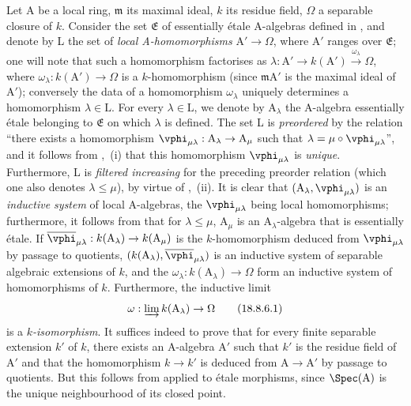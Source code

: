 \begin{env}[18.8.6]
\label{IV.18.8.6}
Let A be a local ring, $\mathfrak{m}$ its maximal ideal, $k$ its residue field, $\Omega$ a separable closure of $k$.
Consider the set $\mathfrak{E}$ of essentially \'{e}tale A-algebras defined in , and denote by L the set of \emph{local A-homomorphisms} $\mathrm{A}'\to\Omega$, where $\mathrm{A}'$ ranges over $\mathfrak{E}$;
one will note that such a homomorphism factorises as $\lambda:\mathrm{A}'\to k(\mathrm{A}')\xrightarrow{\omega_\lambda}\Omega$, where $\omega_\lambda:k(\mathrm{A}')\to\Omega$ is a $k$-homomorphism (since $\mathfrak{m}\mathrm{A}'$ is the maximal ideal of $\mathrm{A}'$);
conversely the data of a homomorphism $\omega_\lambda$ uniquely determines a homomorphism $\lambda\in\mathrm{L}$.
For every $\lambda\in\mathrm{L}$, we denote by $\mathrm{A}_\lambda$ the A-algebra essentially \'{e}tale belonging to $\mathfrak{E}$ on which $\lambda$ is defined.
The set L is \emph{preordered} by the relation ``there exists a homomorphism $\vphi_{\mu\lambda}:\mathrm{A}_\lambda\to\mathrm{A}_\mu$ such that $\lambda=\mu\circ\vphi_{\mu\lambda}$'', and it follows from ,~(i) that this homomorphism $\vphi_{\mu\lambda}$ is \emph{unique}.
Furthermore, L is \emph{filtered increasing} for the preceding preorder relation (which one also denotes $\lambda\leq\mu$), by virtue
of ,~(ii).
It is clear that $(\mathrm{A}_\lambda,\vphi_{\mu\lambda})$ is an \emph{inductive system} of local A-algebras, the $\vphi_{\mu\lambda}$ being local homomorphisms;
furthermore, it follows from  that for $\lambda\leq\mu$, $\mathrm{A}_\mu$ is an $\mathrm{A}_\lambda$-algebra that is essentially \'{e}tale.
If $\overline{\vphi}_{\mu\lambda}:k(\mathrm{A}_\lambda)\to k(\mathrm{A}_\mu)$ is the $k$-homomorphism deduced from $\vphi_{\mu\lambda}$ by passage to quotients, $(k(\mathrm{A}_\lambda),\overline{\vphi}_{\mu\lambda})$ is an inductive system of separable algebraic extensions of $k$, and the $\omega_\lambda:k(\mathrm{A}_\lambda)\to\Omega$ form an inductive system of homomorphisms of $k$.
Furthermore, the inductive limit
\begin{equation}
  \omega:\varinjlim k(\mathrm{A}_\lambda)\to\Omega
  \tag{18.8.6.1}
\end{equation}
is a $k$\emph{-isomorphism}.
It suffices indeed to prove that for every finite separable extension $k'$ of $k$, there exists an A-algebra $\mathrm{A}'$ such that $k'$ is the residue field of $\mathrm{A}'$ and that the homomorphism $k\to k'$ is deduced from $\mathrm{A}\to\mathrm{A}'$ by passage to quotients.
But this follows from  applied to \'{e}tale morphisms, since $\Spec(\mathrm{A})$ is the unique neighbourhood of its closed point.


\end{env}
